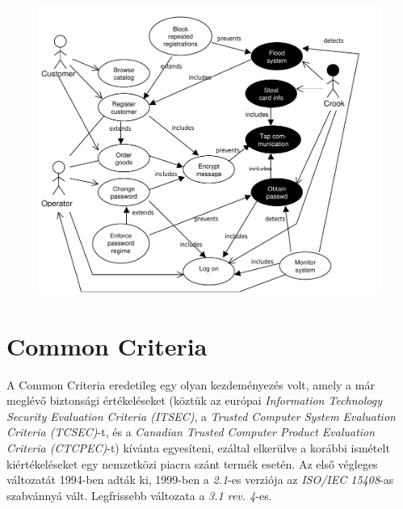\begin{figure}[h]
    \centering
    \includegraphics[width=\textwidth, height=0.5\textheight, keepaspectratio]{figures/misusecase.png}
\end{figure}

\FloatBarrier
% 

\section{Common Criteria}

A Common Criteria eredetileg egy olyan kezdeményezés volt, amely a már meglévő biztonsági
értékeléseket (köztük az európai \emph{Information Technology Security Evaluation Criteria (ITSEC)},
a \emph{Trusted Computer System Evaluation Criteria (TCSEC)}-t, és a
\emph{Canadian Trusted Computer Product Evaluation Criteria (CTCPEC)}-t) kívánta egyesíteni, ezáltal
elkerülve a korábbi ismételt kiértékeléseket egy nemzetközi piacra szánt termék esetén.  Az első
végleges változatát 1994-ben adták ki, 1999-ben a \emph{2.1}-es verziója az \emph{ISO/IEC 15408}-as
szabvánnyá vált. Legfrissebb változata a \emph{3.1 rev. 4}-es.

